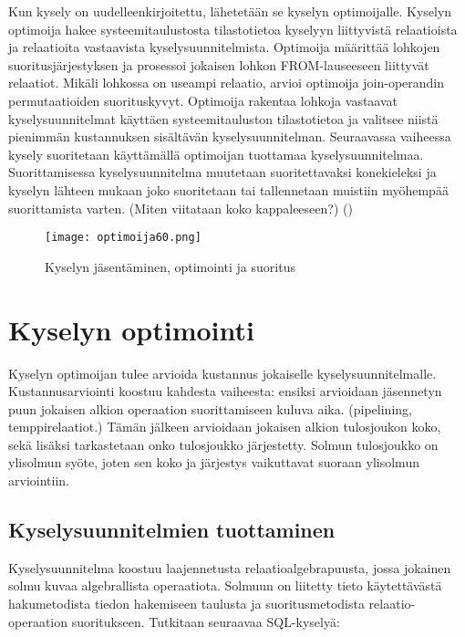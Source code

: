 \documentclass[finnish]{tktltiki2}
\theoremstyle{definition}
\theoremstyle{remark}
\begin{document}
Kun kysely on uudelleenkirjoitettu, lähetetään se kyselyn optimoijalle. Kyselyn optimoija hakee systeemitaulustosta tilastotietoa kyselyyn liittyvistä relaatioista ja relaatioita vastaavista kyselysuunnitelmista. Optimoija määrittää lohkojen suoritusjärjestyksen ja prosessoi jokaisen lohkon FROM-lauseeseen liittyvät relaatiot. Mikäli lohkossa on useampi relaatio, arvioi optimoija join-operandin permutaatioiden suorituskyvyt. Optimoija rakentaa lohkoja vastaavat kyselysuunnitelmat käyttäen systeemitauluston tilastotietoa ja valitsee niistä pienimmän kustannuksen sisältävän kyselysuunnitelman. Seuraavassa vaiheessa kysely suoritetaan käyttämällä optimoijan tuottamaa kyselysuunnitelmaa. Suorittamisessa kyselysuunnitelma muutetaan suoritettavaksi konekieleksi ja kyselyn lähteen mukaan joko suoritetaan tai tallennetaan muistiin myöhempää suorittamista varten. (Miten viitataan koko kappaleeseen?) (\cite{selinger1979access})

\begin{figure}[!h]
  \caption{Kyselyn jäsentäminen, optimointi ja suoritus}
  \centering
    \texttt{[image: optimoija60.png]}
\end{figure}


\section{Kyselyn optimointi}
Kyselyn optimoijan tulee arvioida kustannus jokaiselle kyselysuunnitelmalle. Kustannusarviointi koostuu kahdesta vaiheesta: ensiksi arvioidaan jäsennetyn puun jokaisen alkion operaation suorittamiseen kuluva aika. (pipelining, temppirelaatiot.)
Tämän jälkeen arvioidaan jokaisen alkion tulosjoukon koko, sekä lisäksi tarkastetaan onko tulosjoukko järjestetty. Solmun tulosjoukko on ylisolmun syöte, joten sen koko ja järjestys vaikuttavat suoraan ylisolmun arviointiin.

\subsection{Kyselysuunnitelmien tuottaminen}
Kyselysuunnitelma koostuu laajennetusta relaatioalgebrapuusta, jossa jokainen solmu kuvaa algebrallista operaatiota. Solmuun on liitetty tieto käytettävästä hakumetodista tiedon hakemiseen taulusta ja suoritusmetodista relaatio-operaation suoritukseen. Tutkitaan seuraavaa SQL-kyselyä:
\end{document}
